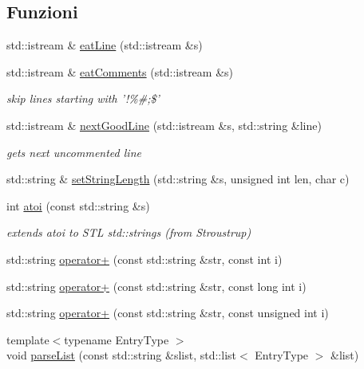 \subsection*{Funzioni}
\begin{DoxyCompactItemize}
\item 
std\-::istream \& \hyperlink{namespaceLifeV_aa91d4c3fafd93fcbfb7d0aca2b771a02}{eat\-Line} (std\-::istream \&s)
\item 
std\-::istream \& \hyperlink{namespaceLifeV_aecf5099a32c6f096d09d0506ee79255b}{eat\-Comments} (std\-::istream \&s)
\begin{DoxyCompactList}\small\item\em skip lines starting with '!\%\#;\$' \end{DoxyCompactList}\item 
std\-::istream \& \hyperlink{namespaceLifeV_a2c4dd8a300964aa48909fce6ad5c72f5}{next\-Good\-Line} (std\-::istream \&s, std\-::string \&line)
\begin{DoxyCompactList}\small\item\em gets next uncommented line \end{DoxyCompactList}\item 
std\-::string \& \hyperlink{namespaceLifeV_a5fb0107fd71b5be2c32f536619a73175}{set\-String\-Length} (std\-::string \&s, unsigned int len, char c)
\item 
int \hyperlink{namespaceLifeV_a1a787279805886c5b208055992c29c9a}{atoi} (const std\-::string \&s)
\begin{DoxyCompactList}\small\item\em extends atoi to S\-T\-L std\-::strings (from Stroustrup) \end{DoxyCompactList}\item 
std\-::string \hyperlink{namespaceLifeV_af57500c586141320ace55cf0b2a5c9fe}{operator+} (const std\-::string \&str, const int i)
\item 
std\-::string \hyperlink{namespaceLifeV_ae00b5ce86e0f837f3f3392074652b7ed}{operator+} (const std\-::string \&str, const long int i)
\item 
std\-::string \hyperlink{namespaceLifeV_a54f5fa0ff0002920c744bcbaff350bc0}{operator+} (const std\-::string \&str, const unsigned int i)
\item 
{\footnotesize template$<$typename Entry\-Type $>$ }\\void \hyperlink{namespaceLifeV_a200b22ebae8c113c2624f7195797d4a4}{parse\-List} (const std\-::string \&slist, std\-::list$<$ Entry\-Type $>$ \&list)
\item 

\end{DoxyCompactItemize}
